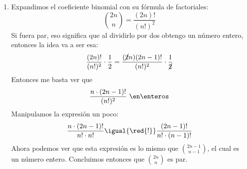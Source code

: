 \begin{enumerate}[label=\alph*)]

  \item
        Expandimos el coeficiente binomial con su fórmula de factoriales:
        $$
          \binom{2n}{n} = \frac{(2n)!}{(n!)^2}
        $$
        Si fuera par, eso significa que al dividirlo por dos obtengo un número entero, entonces la idea va a ser esa:
        $$
          \frac{(2n)!}{(n!)^2} \cdot \frac{1}{2} = \frac{(\cancel{2}n)(2n-1)!}{(n!)^2} \cdot \frac{1}{\cancel{2}}
        $$
        Entonces me basta ver que
        $$
          \frac{n \cdot (2n-1)!}{(n!)^2} ~ \en \enteros
        $$
        Manipulamos la expresión un poco:
        $$
          \frac{n \cdot (2n-1)!}{n! \cdot n!} \igual{\red{!}}
          \frac{(2n-1)!}{n! \cdot  (n-1)!}
        $$
        Ahora podemos ver que esta expresión es lo mismo que $\binom{2n-1}{n-1}$, el cual es un número entero. Concluimos
        entonces que $\binom{2n}{n}$ es par.

\end{enumerate}

\begin{aportes}
  \item {}
  \item {}
\end{aportes}
